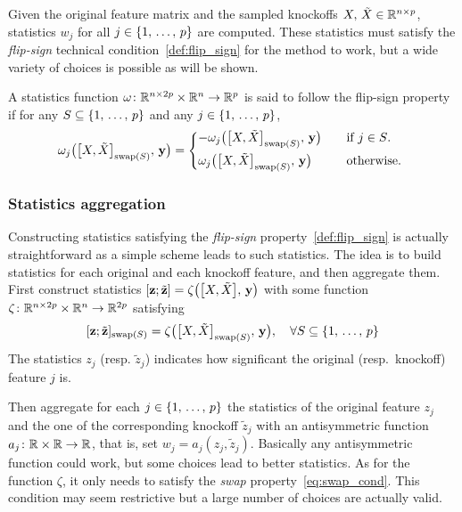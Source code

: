 Given the original feature matrix and the sampled knockoffs $X,\, \tilde{X} \in \mathbb{R}^{n \times p}$,
statistics $w_j$ for all $j \in \left\{ 1,\, \dots,\, p \right\}$ are computed.
These statistics must satisfy the \emph{flip-sign} technical condition~\ref{def:flip_sign} for the method to work,
but a wide variety of choices is possible as will be shown.
\begin{definition}\label{def:flip_sign}
A statistics function $\omega \colon \mathbb{R}^{n \times 2p} \times \mathbb{R}^n \to \mathbb{R}^p$
is said to follow the flip-sign property if for any $S \subseteq \left\{ 1,\, \dots,\, p \right\}$ and any $j \in \left\{ 1,\, \dots,\, p \right\}$,
\begin{equation*}
    \omega_j\big( \big[ X, \tX \big]_{\swap(S)},\, \yy \big) = \begin{cases*}
        -\omega_j\big( \big[ X, \tX \big]_{\swap(S)},\, \yy \big) &\quad\text{if $j \in S$.}\\
        \omega_j\big( \big[ X, \tX \big]_{\swap(S)},\, \yy \big) &\quad\text{otherwise.}
    \end{cases*}
\end{equation*}
\end{definition}

\subsubsection{Statistics aggregation}\label{subsubsec:ksa}

Constructing statistics satisfying the \emph{flip-sign} property~\ref{def:flip_sign} is actually straightforward
as a simple scheme leads to such statistics.
The idea is to build statistics for each original and each knockoff feature, and then aggregate them.
First construct statistics $[ \mathbf{z} ; \tilde{\mathbf{z}} ] = \zeta\big( \big[ X, \tilde{X} \big],\, \mathbf{y} \big)$
with some function $\zeta \colon \mathbb{R}^{n \times 2p} \times \mathbb{R}^n \to \mathbb{R}^{2p}$ satisfying
\begin{equation}\label{eq:swap_cond}
    [ \mathbf{z} ; \tilde{\mathbf{z}} ]_{\operatorname{swap}(S)} = \zeta\big( \big[ X, \tilde{X} \big]_{\operatorname{swap}(S)},\, \mathbf{y} \big)
    ,\quad
    \forall S \subseteq \left\{ 1,\, \dots,\, p \right\}
\end{equation}
The statistics $z_j$ (resp. $\tilde{z}_j$) indicates how significant the original (resp.\ knockoff) feature $j$ is.

Then aggregate for each $j \in \left\{ 1,\, \dots,\, p \right\}$ the statistics of the original feature $z_j$ and the one of the corresponding
knockoff $\tilde{z}_j$ with an antisymmetric function $a_j \colon \mathbb{R}\times\mathbb{R} \to \mathbb{R}$,
that is, set $w_j = a_j(z_j, \tilde{z}_j)$.
Basically any antisymmetric function could work, but some choices lead to better statistics.
As for the function $\zeta$, it only needs to satisfy the \emph{swap} property~\ref{eq:swap_cond}.
This condition may seem restrictive but a large number of choices are actually valid.

